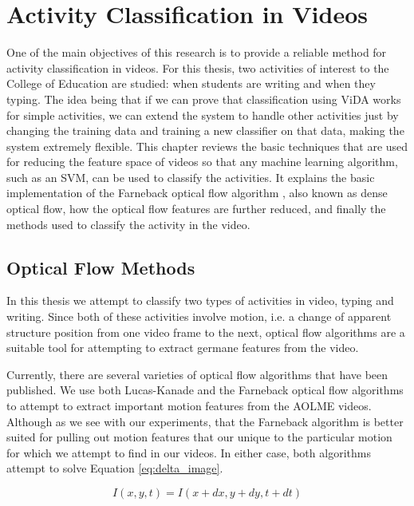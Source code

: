 \chapter{Activity Classification in Videos}
One of the main objectives of this research is to provide a reliable method
for activity classification in videos. For this thesis, two activities of
interest to the College of Education are studied: when students are writing and when they
typing. The idea being that if we can prove that classification using ViDA
works for simple activities, we can extend the system to handle
other activities just by changing the training data and training a new classifier
on that data, making the system extremely flexible. This chapter reviews the basic techniques that are used
for reducing the feature space of videos so that any machine learning algorithm,
such as an SVM, can be used to classify the activities. It explains the basic
implementation of the Farneback optical flow algorithm \cite{farneback2003two}, also known as dense
optical flow, how the optical flow features are further reduced, and finally the
methods used to classify the activity in the video.

\section{\label{section:optical_flow_methods}Optical Flow Methods}
In this thesis we attempt to classify two types of activities in video,  typing
and writing. Since both of these activities involve motion, i.e. a change of
apparent structure position from one video frame to the next, optical flow
algorithms  are a suitable tool for attempting to extract germane features from
the video.

Currently, there are several varieties of optical flow algorithms that have been
published. We use both Lucas-Kanade \cite{lucas1981iterative} and the Farneback
\cite{farneback2003two}  optical flow algorithms to attempt to extract
important motion features from the AOLME videos. Although as we see with our
experiments, that the Farneback algorithm is better suited for pulling out
motion features that our unique to the particular motion for which we attempt
to find in our videos. In either case, both algorithms attempt to solve
Equation \ref{eq:delta_image}.

\begin{equation}
I(x,y,t) = I(x+dx, y+dy, t+dt)
\label{eq:delta_image}
\end{equation}

